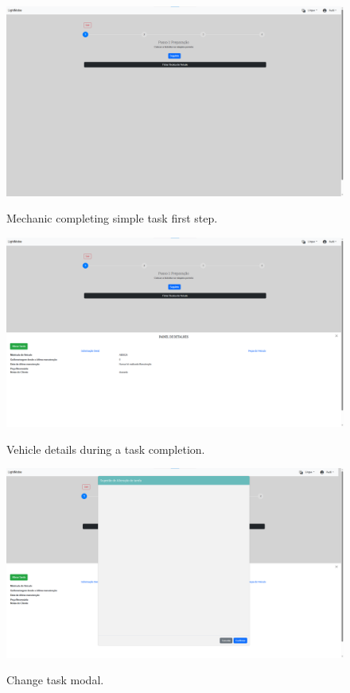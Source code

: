 \begin{figure}[h]
  \caption{Mechanic completing simple task first step.}
  \centering
  \includegraphics[width=\textwidth]{figs/Implementation/mechanic/MechanicTaskNormal}
  \label{fig:MechanicTaskNormal}
\end{figure}

\begin{figure}[h]
  \caption{Vehicle details during a task completion.}
  \centering
  \includegraphics[width=\textwidth]{figs/Implementation/mechanic/MechanicTaskVehicleDetails}
  \label{fig:MechanicTaskVehicleDetails}
\end{figure}


\begin{figure}[h]
  \caption{Change task modal.}
  \centering
  \includegraphics[width=\textwidth]{figs/Implementation/mechanic/MechanicTaskChangeTask}
  \label{fig:MechanicTaskChangeTask}
\end{figure}


